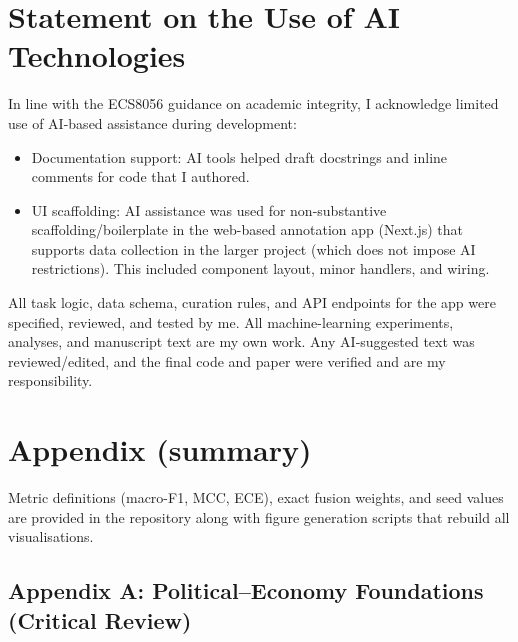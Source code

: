 \documentclass[
  a4paper,
]{article}
\providecommand{\tightlist}{%
  \setlength{\itemsep}{0pt}\setlength{\parskip}{0pt}}\usepackage{longtable,booktabs,array}
\begin{document}
\section{Statement on the Use of AI
Technologies}\label{statement-on-the-use-of-ai-technologies}

In line with the ECS8056 guidance on academic integrity, I acknowledge
limited use of AI-based assistance during development:

\begin{itemize}
\tightlist
\item
  Documentation support: AI tools helped draft docstrings and inline
  comments for code that I authored.
\item
  UI scaffolding: AI assistance was used for non-substantive
  scaffolding/boilerplate in the web-based annotation app (Next.js) that
  supports data collection in the larger project (which does not impose
  AI restrictions). This included component layout, minor handlers, and
  wiring.
\end{itemize}

All task logic, data schema, curation rules, and API endpoints for the
app were specified, reviewed, and tested by me. All machine-learning
experiments, analyses, and manuscript text are my own work. Any
AI‑suggested text was reviewed/edited, and the final code and paper were
verified and are my responsibility.

\section{Appendix (summary)}\label{appendix-summary}

Metric definitions (macro-F1, MCC, ECE), exact fusion weights, and seed
values are provided in the repository along with figure generation
scripts that rebuild all visualisations.

\subsection{Appendix A: Political--Economy Foundations (Critical
Review)}\label{appendix-a-politicaleconomy-foundations-critical-review}
\end{document}
